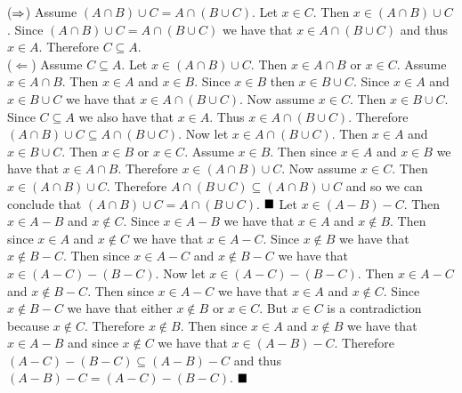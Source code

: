\documentclass[11pt]{book}
\begin{document}
{($\then$) Assume $(A \cap B) \cup C = A \cap (B \cup C)$. Let $x \in C$. Then $x \in (A \cap B) \cup C$. Since $(A \cap B) \cup C = A \cap (B \cup C)$ we have that $x \in A \cap (B \cup C)$ and thus $x \in A$. Therefore $C \subseteq A$.\\ ($\Leftarrow$) Assume $C \subseteq A$. Let $x \in (A \cap B) \cup C$. Then $x \in A \cap B$ or $x \in C$. Assume $x \in A \cap B$. Then $x \in A$ and $x \in B$. Since $x \in B$ then $x \in B \cup C$. Since $x \in A$ and $x \in B \cup C$ we have that $x \in A \cap (B \cup C)$. Now assume $x \in C$. Then $x \in B \cup C$. Since $C \subseteq A$ we also have that $x \in A$. Thus $x \in A \cap (B \cup C)$. Therefore $(A \cap B) \cup C \subseteq A \cap (B \cup C)$. Now let $x \in A \cap (B \cup C)$. Then $x \in A$ and $x \in B \cup C$. Then $x \in B$ or $x \in C$. Assume $x \in B$. Then since $x \in A$ and $x \in B$ we have that $x \in A \cap B$. Therefore $x \in (A \cap B) \cup C$. Now assume $x \in C$. Then $x \in (A \cap B) \cup C$. Therefore $A \cap (B \cup C) \subseteq (A \cap B) \cup C$ and so we can conclude that $(A \cap B) \cup C = A \cap (B \cup C)$. $\qed$}
{Let $x \in (A - B) - C$. Then $x \in A - B$ and $x \notin C$. Since $x \in A - B$ we have that $x \in A$ and $x \notin B$. Then since $x \in A$ and $x \notin C$ we have that $x \in A - C$. Since $x \notin B$ we have that $x \notin B - C$. Then since $x \in A - C$ and $x \notin B - C$ we have that $x \in (A - C) - (B - C)$. Now let $x \in (A - C) - (B - C)$. Then $x \in A - C$ and $x \notin B - C$. Then since $x \in A - C$ we have that $x \in A$ and $x \notin C$. Since $x \notin B - C$ we have that either $x \notin B$ or $x \in C$. But $x \in C$ is a contradiction because $x \notin C$. Therefore $x \notin B$. Then since $x \in A$ and $x \notin B$ we have that $x \in A - B$ and since $x \notin C$ we have that $x \in (A - B) - C$. Therefore $(A - C) - (B - C) \subseteq (A - B) - C$ and thus $(A - B) - C = (A - C) - (B - C)$. $\qed$}
\end{document}
